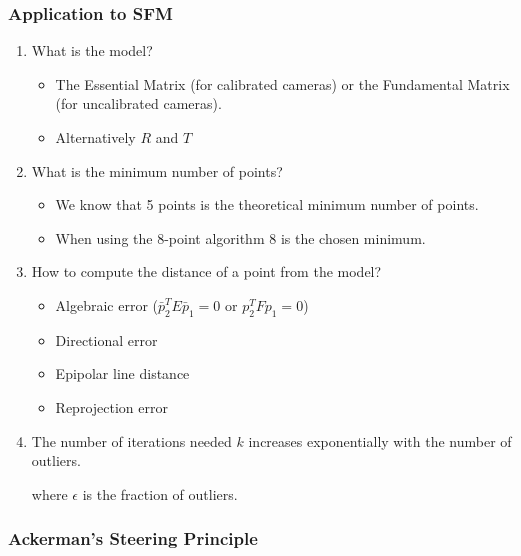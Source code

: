 \documentclass[10pt,a4paper]{scrartcl}
\begin{document}
\begin{multicols*}{2}
\subsubsection{Application to SFM}

\begin{enumerate}
\item What is the model?
\begin{itemize}
\item The Essential Matrix (for calibrated cameras) or the Fundamental Matrix (for uncalibrated cameras).
\item Alternatively $R$ and $T$
\end{itemize}
\item What is the minimum number of points?
\begin{itemize}
\item We know that 5 points is the theoretical minimum number of points.
\item When using the 8-point algorithm 8 is the chosen minimum.
\end{itemize}
\item How to compute the distance of a point from the model?
\begin{itemize}
\item Algebraic error ($\bar{p}_2^TE\bar{p}_1=0$ or $p_2^TFp_1 = 0$)
\item Directional error
\item Epipolar line distance
\item Reprojection error
\end{itemize}

\item The number of iterations needed $k$ increases exponentially with the number of outliers. 


where $\epsilon$ is the fraction of outliers.
\end{enumerate}

\subsubsection{Ackerman's Steering Principle}



\end{multicols*}
\end{document}

